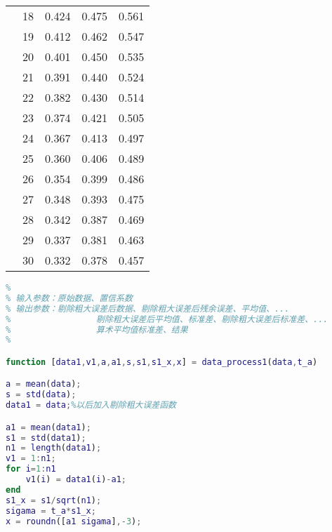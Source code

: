 \begin{tabular}{|p{4cm}<{\centering}|p{2cm}<{\centering}|p{2cm}<{\centering}|p{2cm}<{\centering}|p{2cm}<{\centering}|}
	&18	&0.424	&0.475	&0.561	\\	\cline{2-5}
	&19	&0.412	&0.462	&0.547	\\	\cline{2-5}
	&20	&0.401	&0.450	&0.535	\\	\cline{2-5}
	&21	&0.391	&0.440	&0.524	\\	\cline{2-5}
	&22	&0.382	&0.430	&0.514	\\	\cline{2-5}
	&23	&0.374	&0.421	&0.505	\\	\cline{2-5}
	&24	&0.367	&0.413	&0.497	\\	\cline{2-5}
	&25	&0.360	&0.406	&0.489	\\	\cline{2-5}
	&26	&0.354	&0.399	&0.486	\\	\cline{2-5}
	&27	&0.348	&0.393	&0.475	\\	\cline{2-5}
	&28	&0.342	&0.387	&0.469	\\	\cline{2-5}
	&29	&0.337	&0.381	&0.463	\\	\cline{2-5}
	&30	&0.332	&0.378	&0.457	\\	\hline
\end{tabular}
\newpage
\begin{lstlisting}[language=Matlab]
% 等精度测量数据误差分析
%
% 输入参数：原始数据、置信系数
% 输出参数：剔除粗大误差后数据、剔除粗大误差后残余误差、平均值、...
%                 剔除粗大误差后平均值、标准差、剔除粗大误差后标准差、...
%                 算术平均值标准差、结果
%

function [data1,v1,a,a1,s,s1,s1_x,x] = data_process1(data,t_a)

a = mean(data);
s = std(data);
data1 = data;%以后加入剔除粗大误差函数

a1 = mean(data1);
s1 = std(data1);
n1 = length(data1);
v1 = 1:n1;
for i=1:n1
	v1(i) = data1(i)-a1;
end
s1_x = s1/sqrt(n1);
sigama = t_a*s1_x;
x = roundn([a1 sigama],-3);
\end{lstlisting}

